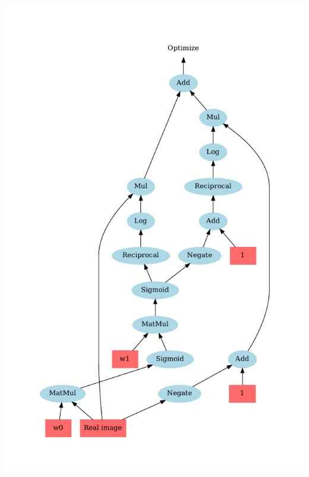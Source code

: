 \documentclass{beamer}
\begin{document}
\begin{frame}
\begin{columns}
\begin{column}{0.5\textwidth}
	\includegraphics[width=\textwidth]{cross_entropy_all.pdf}
\end{column}
\end{columns}
\end{frame}
\end{document}
